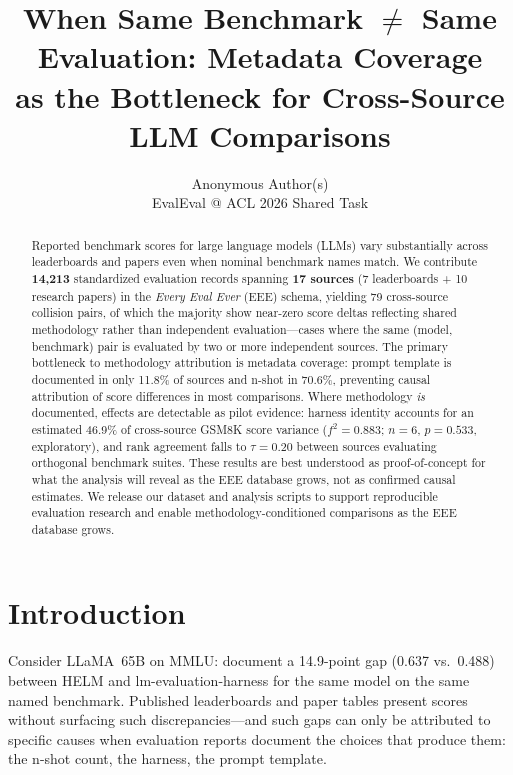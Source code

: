 \documentclass[11pt]{article}
\title{When Same Benchmark $\neq$ Same Evaluation: Metadata Coverage\\
as the Bottleneck for Cross-Source LLM Comparisons}
\author{Anonymous Author(s)\\
  EvalEval @ ACL 2026 Shared Task}
\begin{document}
\maketitle

\begin{abstract}
Reported benchmark scores for large language models (LLMs) vary substantially
across leaderboards and papers even when nominal benchmark names match.
We contribute \textbf{14,213} standardized evaluation records spanning
\textbf{17 sources} (7 leaderboards + 10 research papers) in the
\emph{Every Eval Ever} (EEE) schema, yielding 79 cross-source collision
pairs, of which the majority show near-zero score deltas reflecting shared
methodology rather than independent evaluation---cases where the same
(model, benchmark) pair is evaluated by two or more independent sources.
The primary bottleneck to methodology attribution is metadata coverage:
prompt template is documented in only 11.8\% of sources and n-shot in
70.6\%, preventing causal attribution of score differences in most comparisons.
Where methodology \emph{is} documented, effects are detectable as pilot
evidence: harness identity accounts for an estimated 46.9\% of cross-source
GSM8K score variance ($f^2 = 0.883$; $n=6$, $p=0.533$, exploratory),
and rank agreement falls to $\tau = 0.20$ between sources
evaluating orthogonal benchmark suites.
These results are best understood as proof-of-concept for what the
analysis will reveal as the EEE database grows, not as confirmed causal estimates.
We release our dataset and analysis scripts to support reproducible
evaluation research and enable methodology-conditioned comparisons as
the EEE database grows.
\end{abstract}

\section{Introduction}

Consider LLaMA~65B on MMLU: \citet{alzahrani-2024-benchmarks} document
a 14.9-point gap (0.637 vs.\ 0.488) between HELM and lm-evaluation-harness
for the same model on the same named benchmark.
Published leaderboards and paper tables present scores without
surfacing such discrepancies---and such gaps can only be attributed
to specific causes when evaluation reports document the choices that
produce them: the n-shot count, the harness, the prompt template.
\end{document}
